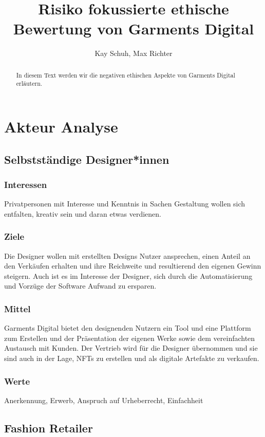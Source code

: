 \documentclass{article}
\title{Risiko fokussierte ethische Bewertung von Garments Digital}
\author{Kay Schuh, Max Richter}
\begin{document}
\maketitle

\begin{abstract}
In diesem Text werden wir die negativen ethischen Aspekte von Garments Digital erläutern.
\end{abstract}

\newpage
\tableofcontents

\newpage

\section{Akteur Analyse}

\subsection{Selbstständige Designer*innen}
\subsubsection{Interessen}
Privatpersonen mit Interesse und Kenntnis in Sachen Gestaltung wollen sich entfalten, kreativ sein und daran etwas verdienen.
\subsubsection{Ziele}
Die Designer wollen mit erstellten Designs Nutzer ansprechen, einen Anteil an den Verkäufen erhalten und ihre Reichweite und resultierend den eigenen Gewinn steigern. Auch ist es im Interesse der Designer, sich durch die Automatisierung und Vorzüge der Software Aufwand zu ersparen.
\subsubsection{Mittel}
Garments Digital bietet den designenden Nutzern ein Tool und eine Plattform zum Erstellen und der Präsentation der eigenen Werke sowie dem vereinfachten Austausch mit Kunden. Der Vertrieb wird für die Designer übernommen und sie sind auch in der Lage, NFTs zu erstellen und als digitale Artefakte zu verkaufen.
\subsubsection{Werte}
Anerkennung, Erwerb, Anspruch auf Urheberrecht, Einfachheit

\subsection{Fashion Retailer}
\end{document}
